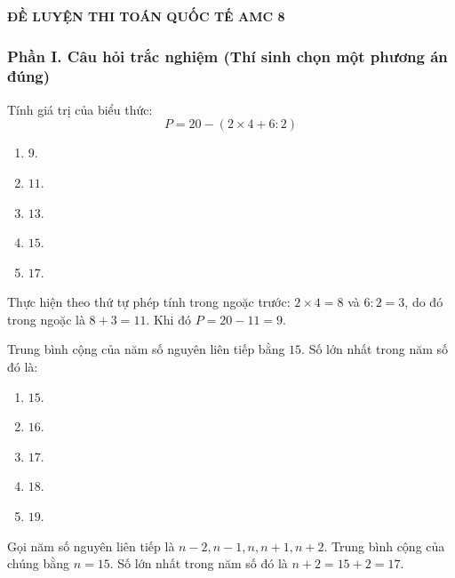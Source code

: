 \begin{center}
	\textbf{{\Huge ĐỀ LUYỆN THI TOÁN QUỐC TẾ AMC 8}}
\end{center}
\subsubsection*{Phần I. Câu hỏi trắc nghiệm (Thí sinh chọn một phương án đúng)}
\setcounter{bt}{0}
\begin{baitap}
Tính giá trị của biểu thức:
$$P = 20 - (2 \times 4 + 6 : 2)$$
\begin{enumerate}
	\item $9$.
	\item $11$.
	\item $13$.
	\item $15$.
	\item $17$.
\end{enumerate}
\begin{traloi}
	Thực hiện theo thứ tự phép tính trong ngoặc trước: $2 \times 4 = 8$ và $6 : 2 = 3$, do đó trong ngoặc là $8 + 3 = 11$. Khi đó $P = 20 - 11 = 9$.
\end{traloi}
\end{baitap}

\begin{baitap}
Trung bình cộng của năm số nguyên liên tiếp bằng $15$. Số lớn nhất trong năm số đó là:
\begin{enumerate}
	\item $15$.
	\item $16$.
	\item $17$.
	\item $18$.
	\item $19$.
\end{enumerate}
\begin{traloi}
	Gọi năm số nguyên liên tiếp là $n-2, n-1, n, n+1, n+2$. Trung bình cộng của chúng bằng $n = 15$. Số lớn nhất trong năm số đó là $n + 2 = 15 + 2 = 17$.
\end{traloi}
\end{baitap}

